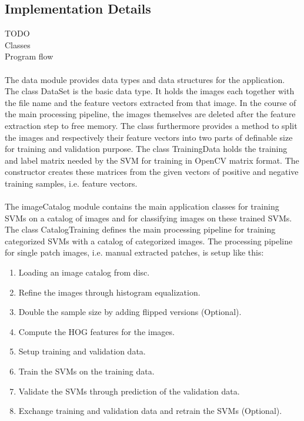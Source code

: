 \subsection{Implementation Details}

TODO
\\
Classes
\\
Program flow
%
\\
\\
The data module provides data types and data structures for the application. The class DataSet is the basic data type. It holds the images each together with the file name and the feature vectors extracted from that image. In the course of the main processing pipeline, the images themselves are deleted after the feature extraction step to free memory. The class furthermore provides a method to split the images and respectively their feature vectors into two parts of definable size for training and validation purpose. The class TrainingData holds the training and label matrix needed by the SVM for training in OpenCV matrix format. The constructor creates these matrices from the given vectors of positive and negative training samples, i.e. feature vectors.
\\
\\
The imageCatalog module contains the main application classes for training SVMs on a catalog of images and for classifying images on these trained SVMs. The class CatalogTraining defines the main processing pipeline for training categorized SVMs with a catalog of categorized images. The processing pipeline for single patch images, i.e. manual extracted patches, is setup like this:

\begin{enumerate}
	\item Loading an image catalog from disc.
	\item Refine the images through histogram equalization.
	\item Double the sample size by adding flipped versions (Optional).
	\item Compute the HOG features for the images.
	\item Setup training and validation data.
	\item Train the SVMs on the training data.
	\item Validate the SVMs through prediction of the validation data.
	\item Exchange training and validation data and retrain the SVMs (Optional).
\end{enumerate}

